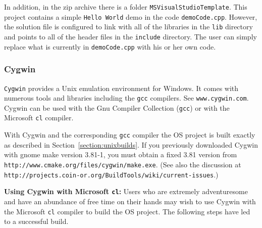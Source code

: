 \documentclass[11pt]{article}
\renewcommand{\_}{{\char"5F}}
\renewcommand{\{}{{\char"7B}}
\renewcommand{\}}{{\char"7D}}
\renewcommand{\^}{{\char"0D}}
\renewcommand{\'}{{\char"0D}}
\newcommand{\UrlCoinCygwin}{http://projects.coin-or.org/BuildTools/wiki/current-issues}
\newcommand{\UrlCygwinMake}{http://www.cmake.org/files/cygwin/make.exe}
\begin{document}
In addition, in the zip archive there is a folder {\tt MSVisualStudioTemplate}. This project contains a simple
{\tt Hello World} demo in the code {\tt demoCode.cpp}. However, the solution file is configured to link with all
of the libraries in the {\tt lib} directory and points to all of the header files in the {\tt include} directory.
The user can simply replace what is currently in {\tt demoCode.cpp} with his or her own code.





\subsubsection{Cygwin}\label{section:cygwin}

{\tt Cygwin} provides a Unix emulation environment for Windows. It comes with numerous tools and libraries including the {\tt gcc} compilers. See {\tt www.cygwin.com}.   Cygwin can be used with the Gnu Compiler Collection ({\tt gcc}) or with the Microsoft {\tt cl} compiler.

\vskip 8pt

  With Cygwin and the corresponding {\tt gcc} compiler the OS project
is built exactly as described in Section~\ref{section:unixbuilds}. If you previously downloaded Cygwin with
gnome make version 3.81-1,  you must obtain a fixed 3.81 version from {\tt\UrlCygwinMake}.
(See also
the discussion at {\tt\UrlCoinCygwin}.)


\vskip 8pt

{\bf Using Cygwin with Microsoft {\tt cl}:}   Users who are extremely adventuresome and have an abundance  of free time on their hands may wish to use Cygwin with the Microsoft {\tt cl} compiler to build the OS project.   The following steps have led to a successful build.
\end{document}
